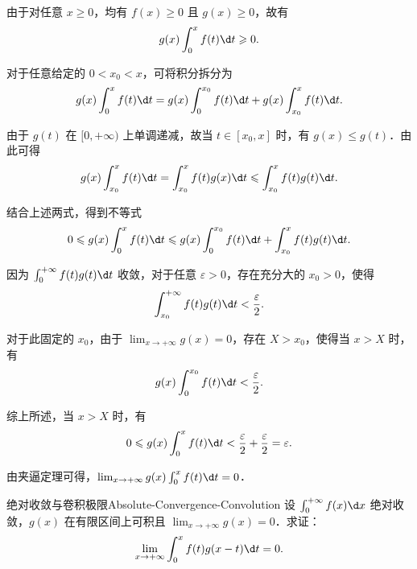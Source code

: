 \begin{myproof}
    由于对任意 $x \geqslant 0$，均有 $f(x) \geqslant 0$ 且 $g(x) \geqslant 0$，故有
    \begin{equation}
        g(x) \int_0^x f(t) \d t \geqslant 0.
    \end{equation}

    对于任意给定的 $0 < x_0 < x$，可将积分拆分为
    \begin{equation}
        g(x) \int_0^x f(t) \d t = g(x) \int_0^{x_0} f(t) \d t + g(x) \int_{x_0}^x f(t) \d t.
    \end{equation}

    由于 $g(t)$ 在 $[0, +\infty)$ 上单调递减，故当 $t \in [x_0, x]$ 时，有 $g(x) \leqslant g(t)$．由此可得
    \begin{equation}
        g(x) \int_{x_0}^x f(t) \d t = \int_{x_0}^x f(t) g(x) \d t \leqslant \int_{x_0}^x f(t) g(t) \d t.
    \end{equation}

    结合上述两式，得到不等式
    \begin{equation}
        0 \leqslant g(x) \int_0^x f(t) \d t \leqslant g(x) \int_0^{x_0} f(t) \d t + \int_{x_0}^x f(t) g(t) \d t.
    \end{equation}

    因为 $\int_0^{+\infty} f(t)g(t) \d t$ 收敛，对于任意 $\varepsilon > 0$，存在充分大的 $x_0 > 0$，使得
    \begin{equation}
        \int_{x_0}^{+\infty} f(t) g(t) \d t < \frac{\varepsilon}{2}.
    \end{equation}

    对于此固定的 $x_0$，由于 $\lim_{x\to +\infty} g(x) = 0$，存在 $X > x_0$，使得当 $x > X$ 时，有
    \begin{equation}
        g(x) \int_0^{x_0} f(t) \d t < \frac{\varepsilon}{2}.
    \end{equation}

    综上所述，当 $x > X$ 时，有
    \begin{equation}
        0 \leqslant g(x) \int_0^x f(t) \d t < \frac{\varepsilon}{2} + \frac{\varepsilon}{2} = \varepsilon.
    \end{equation}

    由夹逼定理可得，$\lim_{x\to +\infty} g(x) \int_0^x f(t) \d t = 0$．
\end{myproof}

\begin{problem}{绝对收敛与卷积极限}{Absolute-Convergence-Convolution}
    设 $\int_0^{+\infty} f(x) \d x$ 绝对收敛，$g(x)$ 在有限区间上可积且 $\lim_{x\to+\infty} g(x) = 0$．求证：
    \begin{equation}
        \lim_{x\to+\infty} \int_0^x f(t)g(x-t) \d t = 0.
    \end{equation}
\end{problem}

